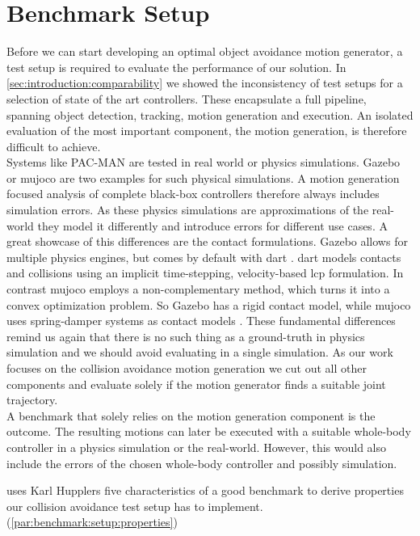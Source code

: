 \section{Benchmark Setup} \label{sec:benchmark}

Before we can start developing an optimal object avoidance motion generator, a test setup is required to evaluate the performance of our solution.
In \cref{sec:introduction:comparability} we showed the inconsistency of test setups for a selection of state of the art controllers.
These encapsulate a full pipeline, spanning object detection, tracking, motion generation and execution.
An isolated evaluation of the most important component, the motion generation, is therefore difficult to achieve.
\\
Systems like {PAC-MAN} \cite{yang_2026} are tested in real world or physics simulations.
Gazebo \cite{koenig_2004} or \acrfull{mujoco} \cite{todorov_2012} are two examples for such physical simulations.
A motion generation focused analysis of complete black-box controllers therefore always includes simulation errors.
As these physics simulations are approximations of the real-world they model it differently and introduce errors for different use cases.
A great showcase of this differences are the contact formulations.
Gazebo allows for multiple physics engines, but comes by default with \acrfull{dart} \cite{lee_2018}.
\acrshort{dart} models contacts and collisions using an implicit time-stepping, velocity-based \acrfull{lcp} formulation.
In contrast \acrshort{mujoco} employs a non-complementary method, which turns it into a convex optimization problem.
So Gazebo has a rigid contact model, while \acrshort{mujoco} uses spring-damper systems as contact models \cite{lee_2018} \cite{todorov_2012}.
These fundamental differences remind us again that there is no such thing as a ground-truth in physics simulation and we should avoid evaluating in a single simulation.
As our work focuses on the collision avoidance motion generation we cut out all other components and evaluate solely if the motion generator finds a suitable joint trajectory.
\\
A benchmark that solely relies on the motion generation component is the outcome.
The resulting motions can later be executed with a suitable whole-body controller in a physics simulation or the real-world.
However, this would also include the errors of the chosen whole-body controller and possibly simulation.
\par
{} uses Karl Hupplers five characteristics of a good benchmark to derive properties our collision avoidance test setup has to implement. (\cref{par:benchmark:setup:properties})
